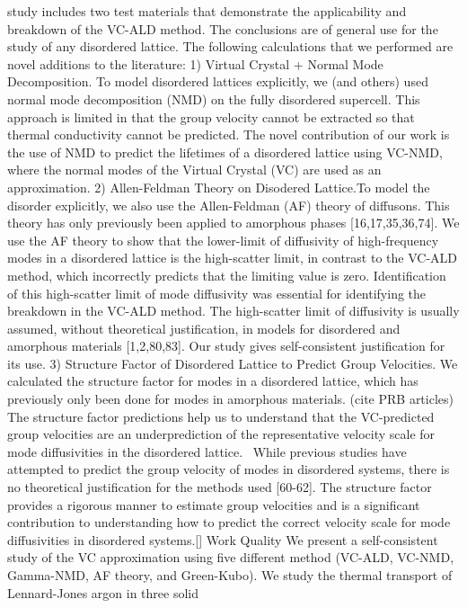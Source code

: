 study includes two test materials that demonstrate the applicability 
and breakdown of the VC-ALD method. The conclusions are of general use 
for the study of any disordered lattice. 
The following calculations that we performed are novel additions to the 
literature:
1) Virtual Crystal + Normal Mode Decomposition. To model disordered 
lattices explicitly, we (and others) used normal mode decomposition 
(NMD) on the fully disordered supercell. This approach is limited in 
that the group velocity cannot be extracted so that thermal conductivity 
cannot be predicted.  The novel contribution of our work is the use of 
NMD to predict the lifetimes of a disordered lattice using VC-NMD, 
where the normal modes of the Virtual Crystal (VC) are used as an 
approximation.
2) Allen-Feldman Theory on Disodered Lattice.To model the disorder 
explicitly, we also use the Allen-Feldman (AF) theory of diffusons. 
This theory has only previously been applied to amorphous phases 
[16,17,35,36,74].  We use the AF theory to show that the lower-limit 
of diffusivity of high-frequency modes in a disordered lattice is the 
high-scatter limit, in contrast to the VC-ALD method, which incorrectly 
predicts that the limiting value is zero. Identification of this 
high-scatter limit of mode diffusivity was essential for identifying 
the breakdown in the VC-ALD method.  The high-scatter limit of 
diffusivity is usually assumed, without theoretical justification, in 
models for disordered and amorphous materials [1,2,80,83]. Our study 
gives self-consistent justification for its use.
3) Structure Factor of Disordered Lattice to Predict Group Velocities. 
We calculated the structure factor for modes in a disordered lattice, 
which has previously only been done for modes in amorphous materials.
(cite PRB articles) The structure factor predictions help us to 
understand that the VC-predicted group velocities are an 
underprediction of the representative velocity scale for mode 
diffusivities in the disordered lattice.  While previous studies 
have attempted to predict the group velocity of modes in disordered 
systems, there is no theoretical justification for the methods used 
[60-62]. The structure factor provides a rigorous manner to estimate 
group velocities and is a significant contribution to understanding 
how to predict the correct velocity scale for mode diffusivities in 
disordered systems.[] 
Work Quality
We present a self-consistent study of the VC approximation using five 
different method (VC-ALD, VC-NMD, Gamma-NMD, AF theory, and Green-Kubo). 
We study the thermal transport of Lennard-Jones argon in three solid 
